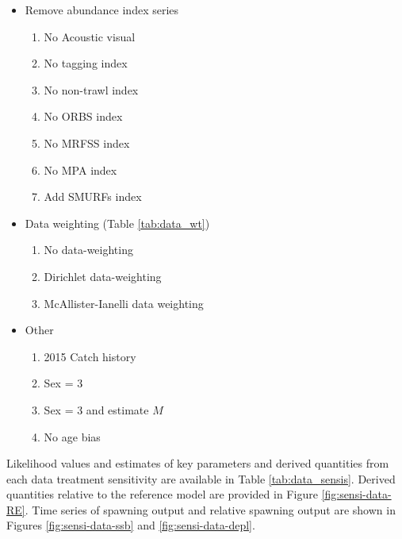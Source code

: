 \documentclass[11pt,
  english,
  letterpaper,
]{article}
\providecommand{\tightlist}{%
  \setlength{\itemsep}{0pt}\setlength{\parskip}{0pt}}
\providecommand{\tightlist}{%
  \setlength{\itemsep}{0pt}\setlength{\parskip}{0pt}}
\begin{document}
\begin{itemize}
\tightlist
\item
  Remove abundance index series

  \begin{enumerate}
  \def\labelenumi{\arabic{enumi}.}
  \tightlist
  \item
    No Acoustic visual
  \item
    No tagging index
  \item
    No non-trawl index
  \item
    No ORBS index
  \item
    No MRFSS index
  \item
    No MPA index
  \item
    Add SMURFs index
  \end{enumerate}
\item
  Data weighting (Table \ref{tab:data_wt})

  \begin{enumerate}
  \def\labelenumi{\arabic{enumi}.}
  \setcounter{enumi}{7}
  \tightlist
  \item
    No data-weighting
  \item
    Dirichlet data-weighting
  \item
    McAllister-Ianelli data weighting
  \end{enumerate}
\item
  Other

  \begin{enumerate}
  \def\labelenumi{\arabic{enumi}.}
  \setcounter{enumi}{10}
  \tightlist
  \item
    2015 Catch history
  \item
    Sex = 3
  \item
    Sex = 3 and estimate \(M\)
  \item
    No age bias
  \end{enumerate}
\end{itemize}

Likelihood values and estimates of key parameters and derived quantities from each data treatment sensitivity are available in Table \ref{tab:data_sensis}. Derived quantities relative to the reference model are provided in Figure \ref{fig:sensi-data-RE}. Time series of spawning output and relative spawning output are shown in Figures \ref{fig:sensi-data-ssb} and \ref{fig:sensi-data-depl}.
\end{document}

